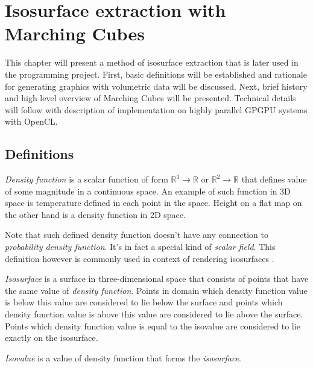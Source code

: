 \chapter{Isosurface extraction with Marching Cubes}
\label{chap:marchingcubes}

This chapter will present a method of isosurface extraction that is later used
in the programming project. First, basic definitions will be established and
rationale for generating graphics with volumetric data will be discussed.
Next, brief history and high level overview of Marching Cubes will be presented.
Technical details will follow with description of implementation on highly
parallel GPGPU systems with OpenCL.

\section{Definitions}

\begin{defn}
\label{def:density function}
\emph{Density function} is a scalar function of form
$\mathbb{R}^3\rightarrow\mathbb{R}$ or $\mathbb{R}^2\rightarrow\mathbb{R}$
that defines value of some magnitude in a continuous space. An example of such
function in 3D space is temperature defined in each point in the space. Height
on a flat map on the other hand is a density function in 2D space.

Note that such defined density function doesn't have any connection to
\emph{probability density function}. It's in fact a special kind of
\emph{scalar field}. This definition however is commonly used in context of
rendering isosurfaces \parencite{gpugems3ch01}.
\end{defn}

\begin{defn} \emph{Isosurface} is a
surface in three-dimensional space that consists of points that have the same
value of \emph{density function}.
Points
in domain which density function value is below this value are considered to
lie below the surface and points which density function value is above this
value are considered to lie above the surface. Points which density function
value is equal to the isovalue are considered to lie exactly on the isosurface.
\end{defn}

\begin{defn} \emph{Isovalue} is a value of density function that forms the
  \emph{isosurface}.
\end{defn}

